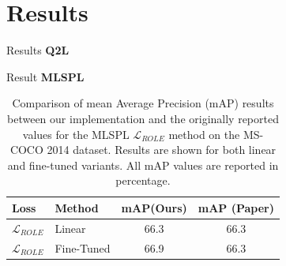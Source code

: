 \section{Results}

\begin{frame}{Results}
  \textbf{Q2L}
  \begin{table}
      \centering
        \caption{\small Mean Average Precision (mAP) comparison between our reproduced results and the Q2L paper on MS-COCO 2014. All values in percentage.}
  \end{table}
\end{frame}

\begin{frame}{Result}
  \textbf{MLSPL}
  \begin{table}
      \caption{Comparison of mean Average Precision (mAP) results between our implementation and the originally reported values for the MLSPL $\mathcal{L}_{ROLE}$ method on the MS-COCO 2014 dataset. Results are shown for both linear and fine-tuned variants. All mAP values are reported in percentage.}
      \label{tab:MLSPL_map_comparison}
      \centering
      \begin{tabular}{l l c c}
      \toprule
      \textbf{Loss} & \textbf{Method} & \textbf{mAP(Ours)} & \textbf{mAP (Paper)} \\
      \midrule
      $\mathcal{L}_{ROLE}$ & Linear & 66.3 & 66.3 \\
      $\mathcal{L}_{ROLE}$ & Fine-Tuned & 66.9 & 66.3 \\
      \bottomrule
      \end{tabular}
  \end{table}
\end{frame}
